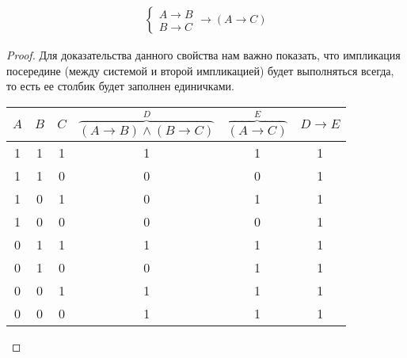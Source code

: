\begin{theorem}
	\hfill \break
	\begin{align*}
		\left\{\begin{array}{l}
			A \rightarrow B \\
			B \rightarrow C
		\end{array}\right. \rightarrow (A \rightarrow C)
	\end{align*}
\end{theorem}

\begin{proof}
	Для доказательства данного свойства нам важно показать, что импликация посередине (между системой и второй импликацией) будет выполняться всегда, то есть ее столбик будет заполнен единичками.
	
	\begin{center}
		\begin{tabular}{ |c|c|c|c|c|c| } 
			\hline
			$A$ & $B$ & $C$ & $\overbrace{(A \rightarrow B) \land (B \rightarrow C)}^{D}$ & $\overbrace{(A \rightarrow C)}^{E}$ & $D \rightarrow E$ \\
			\hline 
			1 & 1 & 1 & 1 & 1 & 1 \\ 
			1 & 1 & 0 & 0 & 0 & 1 \\ 
			1 & 0 & 1 & 0 & 1 & 1 \\ 
			1 & 0 & 0 & 0 & 0 & 1 \\
			0 & 1 & 1 & 1 & 1 & 1 \\ 
			0 & 1 & 0 & 0 & 1 & 1 \\ 
			0 & 0 & 1 & 1 & 1 & 1 \\ 
			0 & 0 & 0 & 1 & 1 & 1 \\ 
			\hline
		\end{tabular}
	\end{center}
\end{proof}